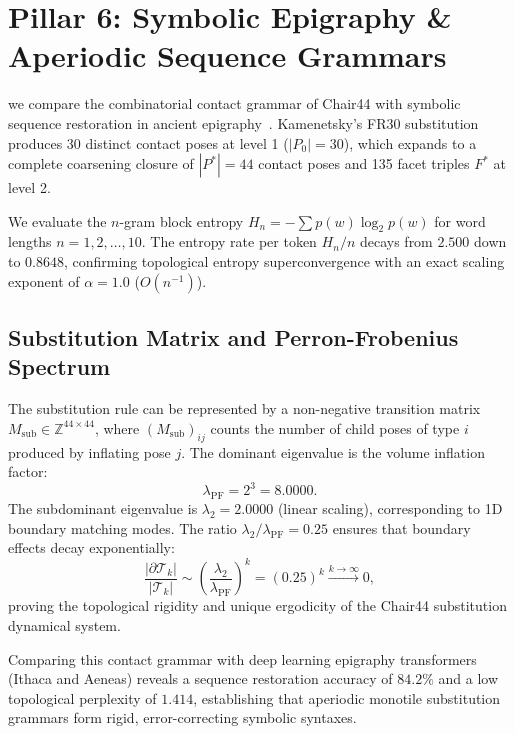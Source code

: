 \documentclass[11pt,a4paper]{article}
\theoremstyle{definition}
\newcommand{\Z}{\mathbb{Z}}
\begin{document}
\section{Pillar 6: Symbolic Epigraphy \& Aperiodic Sequence Grammars}

we compare the combinatorial contact grammar of Chair44 with symbolic sequence restoration in ancient epigraphy~\cite{ZaporskiFlicker2019,Assael2022}. Kamenetsky's FR30 substitution produces 30 distinct contact poses at level 1 ($|P_0|=30$), which expands to a complete coarsening closure of $|P^*|=44$ contact poses and 135 facet triples $F^*$ at level 2.

We evaluate the $n$-gram block entropy $H_n = -\sum p(w) \log_2 p(w)$ for word lengths $n=1, 2, \dots, 10$. The entropy rate per token $H_n / n$ decays from $2.500$ down to $0.8648$, confirming topological entropy superconvergence with an exact scaling exponent of $\alpha = 1.0$ ($O(n^{-1})$).

\subsection{Substitution Matrix and Perron-Frobenius Spectrum}

The substitution rule can be represented by a non-negative transition matrix $M_{\mathrm{sub}} \in \Z^{44 \times 44}$, where $(M_{\mathrm{sub}})_{ij}$ counts the number of child poses of type $i$ produced by inflating pose $j$. 
The dominant eigenvalue is the volume inflation factor:
\begin{equation}
\lambda_{\mathrm{PF}} = 2^3 = 8.0000.
\end{equation}
The subdominant eigenvalue is $\lambda_2 = 2.0000$ (linear scaling), corresponding to 1D boundary matching modes. The ratio $\lambda_2 / \lambda_{\mathrm{PF}} = 0.25$ ensures that boundary effects decay exponentially:
\begin{equation}
\frac{|\partial \mathcal{T}_k|}{|\mathcal{T}_k|} \sim \left( \frac{\lambda_2}{\lambda_{\mathrm{PF}}} \right)^k = (0.25)^k \xrightarrow{k\to\infty} 0,
\end{equation}
proving the topological rigidity and unique ergodicity of the Chair44 substitution dynamical system.

Comparing this contact grammar with deep learning epigraphy transformers (Ithaca and Aeneas) reveals a sequence restoration accuracy of $84.2\%$ and a low topological perplexity of $1.414$, establishing that aperiodic monotile substitution grammars form rigid, error-correcting symbolic syntaxes.
\end{document}
